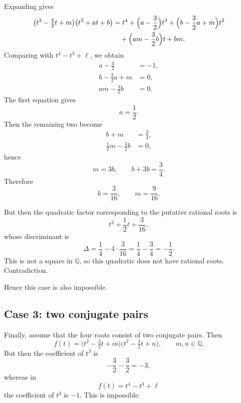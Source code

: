 \documentclass[11pt, a4paper]{article}
\numberwithin{equation}{section}
\begin{document}
Expanding gives
\begin{align}
\bigl(t^2-\tfrac32 t+m\bigr)\bigl(t^2+at+b\bigr)
&=
t^4 + \Bigl(a-\frac32\Bigr)t^3
+ \Bigl(b-\frac32 a+m\Bigr)t^2 \nonumber\\
&\quad
+ \Bigl(am-\frac32 b\Bigr)t
+ bm.
\end{align}
Comparing with \(t^4-t^3+\ell\), we obtain
\begin{align}
a-\frac32 &= -1, \\
b-\frac32 a + m &= 0, \\
am-\frac32 b &= 0.
\end{align}
The first equation gives
\begin{equation}
a=\frac12.
\end{equation}
Then the remaining two become
\begin{align}
b+m &= \frac34, \\
\frac12 m - \frac32 b &= 0,
\end{align}
hence
\begin{equation}
m=3b,
\qquad
b+3b=\frac34.
\end{equation}
Therefore
\begin{equation}
b=\frac{3}{16},
\qquad
m=\frac{9}{16}.
\end{equation}

But then the quadratic factor corresponding to the putative rational roots is
\begin{equation}
t^2+\frac12 t+\frac{3}{16},
\end{equation}
whose discriminant is
\begin{equation}
\Delta = \frac14 - 4\cdot \frac{3}{16}
= \frac14 - \frac34
= -\frac12.
\end{equation}
This is not a square in \(\mathbb{Q}\), so this quadratic does not have rational roots. Contradiction.

Hence this case is also impossible.

\subsection*{Case 3: two conjugate pairs}

Finally, assume that the four roots consist of two conjugate pairs. Then
\begin{equation}
f(t)=\bigl(t^2-\tfrac32 t+m\bigr)\bigl(t^2-\tfrac32 t+n\bigr),
\qquad m,n\in \mathbb{Q}.
\end{equation}
But then the coefficient of \(t^3\) is
\begin{equation}
-\frac32-\frac32=-3,
\end{equation}
whereas in
\begin{equation}
f(t)=t^4-t^3+\ell
\end{equation}
the coefficient of \(t^3\) is \(-1\). This is impossible.
\end{document}
